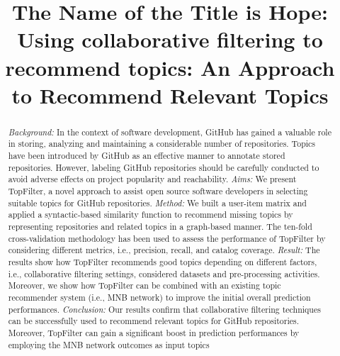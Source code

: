 \documentclass[sigconf]{acmart}
\begin{document}
\title{The Name of the Title is Hope}

\title{\CT: Using collaborative filtering to recommend \GH topics}

\title{\CT: An Approach to Recommend Relevant \GH Topics}%





 


\begin{abstract}
\textit{Background:} In the context of software development, GitHub has gained 
a valuable role in storing, analyzing and maintaining a considerable number of 
repositories. Topics have been introduced by GitHub as an effective manner to 
annotate stored repositories. However, labeling GitHub repositories should be 
carefully conducted to avoid adverse effects on project popularity and 
reachability.
\textit{Aims:} We present TopFilter, a novel approach to assist open source 
software developers in selecting suitable topics for GitHub repositories.
\textit{Method:} We built a user-item matrix and applied a syntactic-based 
similarity 
function to recommend missing topics by representing repositories and related 
topics in a graph-based manner. The ten-fold cross-validation methodology has 
been used to assess the performance of TopFilter by considering different 
metrics, i.e., precision, recall, and catalog coverage.
\textit{Result:} The results show how TopFilter recommends good topics 
depending on different factors, i.e., collaborative filtering settings, 
considered datasets and pre-processing activities. Moreover, we show how 
TopFilter can be combined with an existing topic recommender system (i.e., MNB 
network) to improve the initial overall prediction performances.
\textit{Conclusion:} Our results confirm that collaborative filtering 
techniques can be successfully used to recommend relevant topics for GitHub 
repositories. Moreover, TopFilter can gain a significant boost in prediction 
performances by employing the MNB network outcomes as input topics


\end{abstract}
\end{document}
